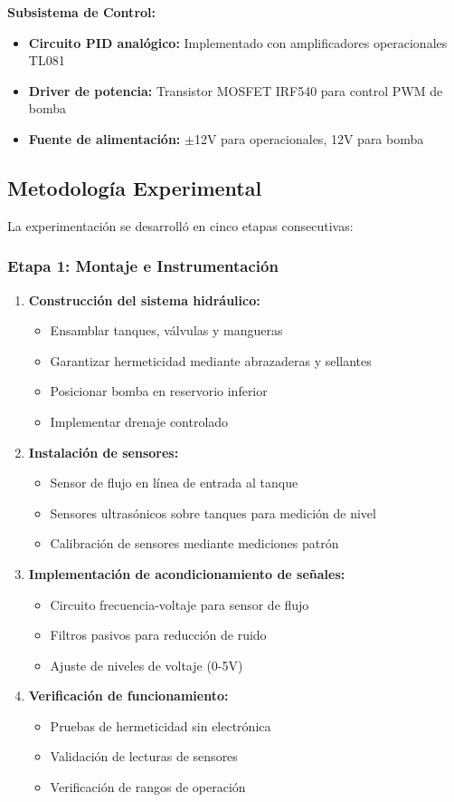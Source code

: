 \documentclass[conference]{IEEEtran}
\begin{document}
\textbf{Subsistema de Control:}
\begin{itemize}
\item \textbf{Circuito PID analógico:} Implementado con amplificadores operacionales TL081
\item \textbf{Driver de potencia:} Transistor MOSFET IRF540 para control PWM de bomba
\item \textbf{Fuente de alimentación:} $\pm$12V para operacionales, 12V para bomba
\end{itemize}

\subsection{Metodología Experimental}

La experimentación se desarrolló en cinco etapas consecutivas:

\subsubsection{Etapa 1: Montaje e Instrumentación}

\begin{enumerate}
\item \textbf{Construcción del sistema hidráulico:}
\begin{itemize}
\item Ensamblar tanques, válvulas y mangueras
\item Garantizar hermeticidad mediante abrazaderas y sellantes
\item Posicionar bomba en reservorio inferior
\item Implementar drenaje controlado
\end{itemize}

\item \textbf{Instalación de sensores:}
\begin{itemize}
\item Sensor de flujo en línea de entrada al tanque
\item Sensores ultrasónicos sobre tanques para medición de nivel
\item Calibración de sensores mediante mediciones patrón
\end{itemize}

\item \textbf{Implementación de acondicionamiento de señales:}
\begin{itemize}
\item Circuito frecuencia-voltaje para sensor de flujo
\item Filtros pasivos para reducción de ruido
\item Ajuste de niveles de voltaje (0-5V)
\end{itemize}

\item \textbf{Verificación de funcionamiento:}
\begin{itemize}
\item Pruebas de hermeticidad sin electrónica
\item Validación de lecturas de sensores
\item Verificación de rangos de operación
\end{itemize}
\end{enumerate}
\end{document}

